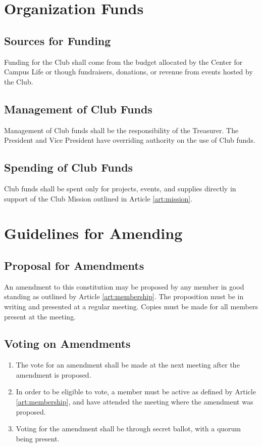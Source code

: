 \documentclass[english,11pt]{article}
\begin{document}
\section{Organization Funds} \label{art:funds}

\subsection{Sources for Funding} \label{sect:funds:sources}
Funding for the Club shall come from the budget allocated by the Center for Campus Life or though fundraisers, donations, or revenue from events hosted by the Club.

\subsection{Management of Club Funds} \label{sect:funds:management}
Management of Club funds shall be the responsibility of the Treasurer.
The President and Vice President have overriding authority on the use of Club funds.

\subsection{Spending of Club Funds} \label{sect:funds:spending}
Club funds shall be spent only for projects, events, and supplies directly in support of the Club Mission outlined in Article \ref{art:mission}.

\section{Guidelines for Amending} \label{art:amending}

\subsection{Proposal for Amendments} \label{sect:amending:proposal}
An amendment to this constitution may be proposed by any member in good standing as outlined by Article \ref{art:membership}.
The proposition must be in writing and presented at a regular meeting.
Copies must be made for all members present at the meeting.

\subsection{Voting on Amendments}  \label{sect:amending:voting}
\begin{enumerate}[label=\Alph*.]
    \item The vote for an amendment shall be made at the next meeting after the amendment is proposed.
    \item In order to be eligible to vote, a member must be active as defined by Article \ref{art:membership}, and have attended the meeting where the amendment was proposed.
    \item Voting for the amendment shall be through secret ballot, with a quorum being present.
\end{enumerate}
\end{document}
